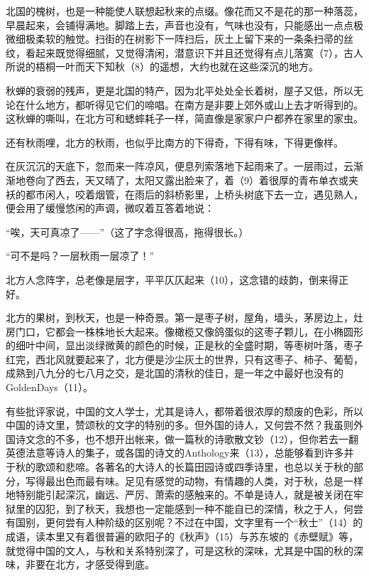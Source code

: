 \documentclass[letterpaper,12pt,english]{sphinxmanual}
\begin{document}
北国的槐树，也是一种能使人联想起秋来的点缀。像花而又不是花的那一种落蕊，早晨起来，会铺得满地。脚踏上去，声音也没有，气味也没有，只能感出一点点极微细极柔软的触觉。扫街的在树影下一阵扫后，灰土上留下来的一条条扫帚的丝纹，看起来既觉得细腻，又觉得清闲，潜意识下并且还觉得有点儿落寞（7），古人所说的梧桐一叶而天下知秋（8）的遥想，大约也就在这些深沉的地方。

秋蝉的衰弱的残声，更是北国的特产，因为北平处处全长着树，屋子又低，所以无论在什么地方，都听得见它们的啼唱。在南方是非要上郊外或山上去才听得到的。这秋蝉的嘶叫，在北方可和蟋蟀耗子一样，简直像是家家户户都养在家里的家虫。

还有秋雨哩，北方的秋雨，也似乎比南方的下得奇，下得有味，下得更像样。

在灰沉沉的天底下，忽而来一阵凉风，便息列索落地下起雨来了。一层雨过，云渐渐地卷向了西去，天又晴了，太阳又露出脸来了，着（9）着很厚的青布单衣或夹袄的都市闲人，咬着烟管，在雨后的斜桥影里，上桥头树底下去一立，遇见熟人，便会用了缓慢悠闲的声调，微叹着互答着地说：

“唉，天可真凉了——”（这了字念得很高，拖得很长。）

“可不是吗？一层秋雨一层凉了！”

北方人念阵字，总老像是层字，平平仄仄起来（10），这念错的歧韵，倒来得正好。

北方的果树，到秋天，也是一种奇景。第一是枣子树，屋角，墙头，茅房边上，灶房门口，它都会一株株地长大起来。像橄榄又像鸽蛋似的这枣子颗儿，在小椭圆形的细叶中间，显出淡绿微黄的颜色的时候，正是秋的全盛时期，等枣树叶落，枣子红完，西北风就要起来了，北方便是沙尘灰土的世界，只有这枣子、柿子、葡萄，成熟到八九分的七八月之交，是北国的清秋的佳日，是一年之中最好也没有的GoldenDays（11）。

有些批评家说，中国的文人学士，尤其是诗人，都带着很浓厚的颓废的色彩，所以中国的诗文里，赞颂秋的文字的特别的多。但外国的诗人，又何尝不然？我虽则外国诗文念的不多，也不想开出帐来，做一篇秋的诗歌散文钞（12），但你若去一翻英德法意等诗人的集子，或各国的诗文的Anthology来（13），总能够看到许多并于秋的歌颂和悲啼。各著名的大诗人的长篇田园诗或四季诗里，也总以关于秋的部分，写得最出色而最有味。足见有感觉的动物，有情趣的人类，对于秋，总是一样地特别能引起深沉，幽远、严厉、萧索的感触来的。不单是诗人，就是被关闭在牢狱里的囚犯，到了秋天，我想也一定能感到一种不能自已的深情，秋之于人，何尝有国别，更何尝有人种阶级的区别呢？不过在中国，文字里有一个“秋士”（14）的成语，读本里又有着很普遍的欧阳子的《秋声》（15）与苏东坡的《赤壁赋》等，就觉得中国的文人，与秋和关系特别深了，可是这秋的深味，尤其是中国的秋的深味，非要在北方，才感受得到底。
\end{document}
